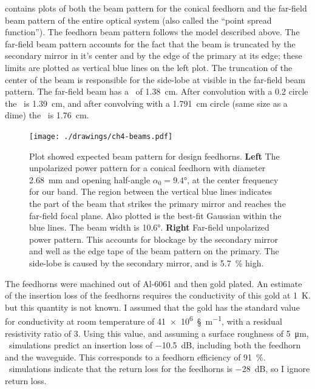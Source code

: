  contains plots of both the beam pattern for the conical feedhorn and the far-field beam pattern of the entire optical system (also called the ``point spread function'').
The feedhorn beam pattern follows the model described above.
The far-field beam pattern accounts for the fact that the beam is truncated by the secondary mirror in it's center and by the edge of the primary at its edge; these limits are plotted as vertical blue lines on the left plot.
The truncation of the center of the beam is responsible for the side-lobe at \abt{\SI{}{\percent}} visible in the far-field beam pattern.
The far-field beam has a \FWHM\ of \SI{1.38}{\cm}.
After convolution with a \SI{0.2}{\in} circle the \FWHM\ is \SI{1.39}{\cm}, and after convolving with a \SI{1.791}{\cm} circle (same size as a dime) the \FWHM\ is \SI{1.76}{\cm}.

\begin{figure}
\centering
\texttt{[image: ./drawings/ch4-beams.pdf]}
\caption{
  Plot showed expected beam pattern for design feedhorns.
  \textbf{Left} The unpolarized power pattern for a conical feedhorn with diameter \SI{2.68}{\mm} and opening half-angle $\alpha_0 = \ang{9.4}$, at the center frequency for our band.
  The region between the vertical blue lines indicates the part of the beam that strikes the primary mirror and reaches the far-field focal plane.
  Also plotted is the best-fit Gaussian within the blue lines.
  The \FWHM beam width is \ang{10.6}.
  \textbf{Right} Far-field unpolarized power pattern.
  This accounts for blockage by the secondary mirror and well as the edge tape of the beam pattern on the primary.
  The side-lobe is caused by the secondary mirror, and is \SI{5.7}{\percent} high.
}
\label{fig:ch4-beams}
\end{figure}

The feedhorns were machined out of Al-6061 and then gold plated.
An estimate of the insertion loss of the feedhorns requires the conductivity of this gold at \SI{1}{\K}. but this quantity is not known.
I assumed that the gold has the standard value for conductivity at room temperature of \SI{41e6}{\S\per\m}, with a residual resistivity ratio of 3.
Using this value, and assuming a surface roughness of \SI{5}{\um}, \HFSS\ simulations predict an insertion loss of \SI{-10.5}{\dB}, including both the feedhorn and the waveguide.
This corresponds to a feedhorn efficiency of \SI{91}{\percent}.
\HFSS\ simulations indicate that the return loss for the feedhorns is \SI{-28}{\dB}, so I ignore return loss.

